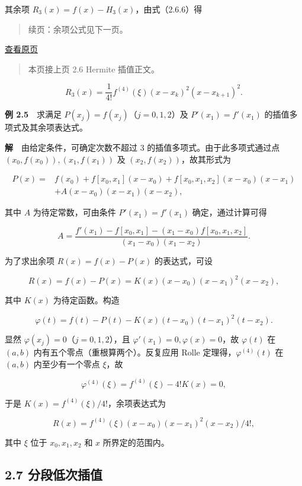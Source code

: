 \documentclass[
  10pt,
  fontset=fandol]{ctexart}
\begin{document}
其余项 \(R_3(x)=f(x)-H_3(x)\)，由式（2.6.6）得

\begin{quote}
续页：余项公式见下一页。
\end{quote}

\href{../../source-images/pdf-045.jpeg}{查看原页}

\begin{quote}
本页接上页 2.6 Hermite 插值正文。
\end{quote}

\[R_3(x)=\frac{1}{4!}f^{(4)}(\xi)(x-x_k)^2(x-x_{k+1})^2.\]

\textbf{例 2.5}　求满足 \(P(x_j)=f(x_j)\)（\(j=0,1,2\)）及 \(P'(x_1)=f'(x_1)\) 的插值多项式及其余项表达式。

\textbf{解}　由给定条件，可确定次数不超过 3 的插值多项式。由于此多项式通过点 \((x_0,f(x_0)),(x_1,f(x_1))\) 及 \((x_2,f(x_2))\)，故其形式为

\[\begin{aligned}
P(x)={}&f(x_0)+f[x_0,x_1](x-x_0)+f[x_0,x_1,x_2](x-x_0)(x-x_1)\\
&+A(x-x_0)(x-x_1)(x-x_2),
\end{aligned}\]

其中 \(A\) 为待定常数，可由条件 \(P'(x_1)=f'(x_1)\) 确定，通过计算可得

\[A=\frac{f'(x_1)-f[x_0,x_1]-(x_1-x_0)f[x_0,x_1,x_2]}{(x_1-x_0)(x_1-x_2)}.\]

为了求出余项 \(R(x)=f(x)-P(x)\) 的表达式，可设

\[R(x)=f(x)-P(x)=K(x)(x-x_0)(x-x_1)^2(x-x_2),\]

其中 \(K(x)\) 为待定函数。构造

\[\varphi(t)=f(t)-P(t)-K(x)(t-x_0)(t-x_1)^2(t-x_2).\]

显然 \(\varphi(x_j)=0\)（\(j=0,1,2\)），且 \(\varphi'(x_1)=0,\varphi(x)=0\)，故 \(\varphi(t)\) 在 \((a,b)\) 内有五个零点（重根算两个）。反复应用 Rolle 定理得，\(\varphi^{(4)}(t)\) 在 \((a,b)\) 内至少有一个零点 \(\xi\)，故

\[\varphi^{(4)}(\xi)=f^{(4)}(\xi)-4!K(x)=0,\]

于是 \(K(x)=f^{(4)}(\xi)/4!\)，余项表达式为

\[R(x)=f^{(4)}(\xi)(x-x_0)(x-x_1)^2(x-x_2)/4!,\tag{2.6.11}\]

其中 \(\xi\) 位于 \(x_0,x_1,x_2\) 和 \(x\) 所界定的范围内。

\subsection{2.7 分段低次插值}\label{ux5206ux6bb5ux4f4eux6b21ux63d2ux503c}
\end{document}
